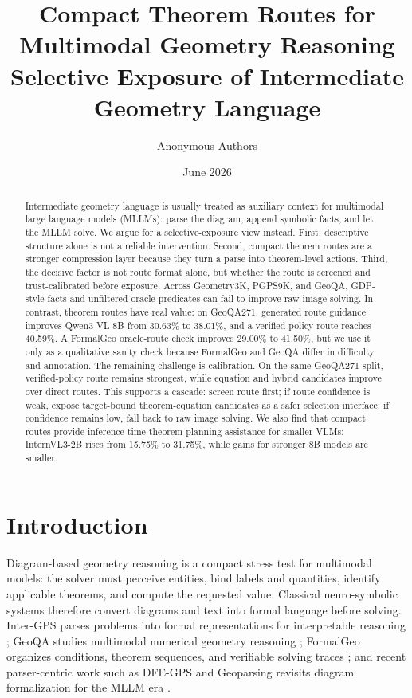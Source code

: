 \documentclass[11pt]{article}
\title{Compact Theorem Routes for Multimodal Geometry Reasoning\\
\large Selective Exposure of Intermediate Geometry Language}
\author{Anonymous Authors}
\date{June 2026}
\begin{document}
\maketitle

\begin{abstract}
Intermediate geometry language is usually treated as auxiliary context for multimodal large language models (MLLMs): parse the diagram, append symbolic facts, and let the MLLM solve. We argue for a selective-exposure view instead. First, descriptive structure alone is not a reliable intervention. Second, compact theorem routes are a stronger compression layer because they turn a parse into theorem-level actions. Third, the decisive factor is not route format alone, but whether the route is screened and trust-calibrated before exposure. Across Geometry3K, PGPS9K, and GeoQA, GDP-style facts and unfiltered oracle predicates can fail to improve raw image solving. In contrast, theorem routes have real value: on GeoQA271, generated route guidance improves Qwen3-VL-8B from 30.63\% to 38.01\%, and a verified-policy route reaches 40.59\%. A FormalGeo oracle-route check improves 29.00\% to 41.50\%, but we use it only as a qualitative sanity check because FormalGeo and GeoQA differ in difficulty and annotation. The remaining challenge is calibration. On the same GeoQA271 split, verified-policy route remains strongest, while equation and hybrid candidates improve over direct routes. This supports a cascade: screen route first; if route confidence is weak, expose target-bound theorem-equation candidates as a safer selection interface; if confidence remains low, fall back to raw image solving. We also find that compact routes provide inference-time theorem-planning assistance for smaller VLMs: InternVL3-2B rises from 15.75\% to 31.75\%, while gains for stronger 8B models are smaller.
\end{abstract}

\section{Introduction}
Diagram-based geometry reasoning is a compact stress test for multimodal models: the solver must perceive entities, bind labels and quantities, identify applicable theorems, and compute the requested value. Classical neuro-symbolic systems therefore convert diagrams and text into formal language before solving. Inter-GPS parses problems into formal representations for interpretable reasoning \cite{lu2021intergps}; GeoQA studies multimodal numerical geometry reasoning \cite{chen2021geoqa}; FormalGeo organizes conditions, theorem sequences, and verifiable solving traces \cite{zhang2023formalgeo}; and recent parser-centric work such as DFE-GPS and Geoparsing revisits diagram formalization for the MLLM era \cite{zhang2024dfegps,wang2026geoparsing}.
\end{document}
